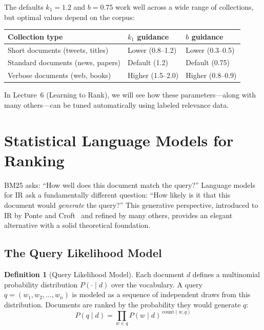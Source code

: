 \documentclass[11pt,a4paper]{article}
\theoremstyle{definition}
\newtheorem{definition}{Definition}[section]
\theoremstyle{plain}
\begin{document}
The defaults $k_1 = 1.2$ and $b = 0.75$ work well across a wide range of collections, but optimal values depend on the corpus:

\begin{center}
\begin{tabular}{lll}
\toprule
\textbf{Collection type} & \textbf{$k_1$ guidance} & \textbf{$b$ guidance} \\
\midrule
Short documents (tweets, titles) & Lower (0.8--1.2) & Lower (0.3--0.5) \\
Standard documents (news, papers) & Default (1.2) & Default (0.75) \\
Verbose documents (web, books) & Higher (1.5--2.0) & Higher (0.8--0.9) \\
\bottomrule
\end{tabular}
\end{center}

In Lecture~6 (Learning to Rank), we will see how these parameters---along with many others---can be tuned automatically using labeled relevance data.


\section{Statistical Language Models for Ranking}
\label{sec:lm}

BM25 asks: ``How well does this document match the query?'' Language models for IR ask a fundamentally different question: ``How likely is it that this document would \emph{generate} the query?'' This generative perspective, introduced to IR by Ponte and Croft~\cite{ponte1998language} and refined by many others, provides an elegant alternative with a solid theoretical foundation.

\subsection{The Query Likelihood Model}

\begin{definition}[Query Likelihood Model]
Each document $d$ defines a multinomial probability distribution $P(\cdot \mid d)$ over the vocabulary. A query $q = (w_1, w_2, \ldots, w_n)$ is modeled as a sequence of independent draws from this distribution. Documents are ranked by the probability they would generate $q$:
\begin{equation}
P(q \mid d) = \prod_{w \in q} P(w \mid d)^{\,\text{count}(w, q)}
\label{eq:qlm}
\end{equation}
\end{definition}
\end{document}
